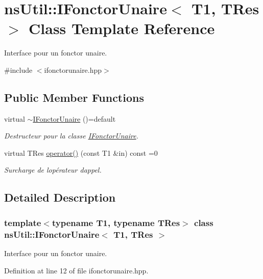 \hypertarget{classns_util_1_1_i_fonctor_unaire}{}\section{ns\+Util\+:\+:I\+Fonctor\+Unaire$<$ T1, T\+Res $>$ Class Template Reference}
\label{classns_util_1_1_i_fonctor_unaire}


Interface pour un fonctor unaire.  




{\ttfamily \#include $<$ifonctorunaire.\+hpp$>$}

\subsection*{Public Member Functions}
\begin{DoxyCompactItemize}
\item 
virtual \hyperlink{classns_util_1_1_i_fonctor_unaire_ae41ac6b220f0afa4b0860e92c27b3cd1}{$\sim$\+I\+Fonctor\+Unaire} ()=default
\begin{DoxyCompactList}\small\item\em Destructeur pour la classe \hyperlink{classns_util_1_1_i_fonctor_unaire}{I\+Fonctor\+Unaire}. \end{DoxyCompactList}\item 
virtual T\+Res \hyperlink{classns_util_1_1_i_fonctor_unaire_a2f53e65b0a64a4eb543a709eb72ed3ab}{operator()} (const T1 \&in) const =0
\begin{DoxyCompactList}\small\item\em Surcharge de l\textquotesingle{}opérateur d\textquotesingle{}appel. \end{DoxyCompactList}\end{DoxyCompactItemize}


\subsection{Detailed Description}
\subsubsection*{template$<$typename T1, typename T\+Res$>$\newline
class ns\+Util\+::\+I\+Fonctor\+Unaire$<$ T1, T\+Res $>$}

Interface pour un fonctor unaire. 

Definition at line 12 of file ifonctorunaire.\+hpp.



